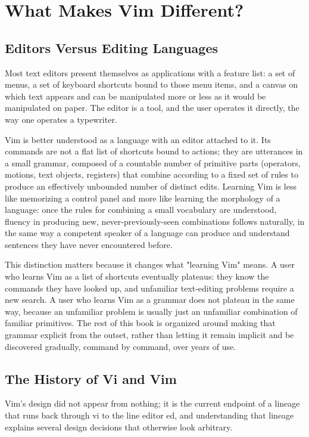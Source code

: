 \chapter{What Makes Vim Different?}
\label{ch:different}

\section{Editors Versus Editing Languages}

Most text editors present themselves as applications with a feature list: a set of menus, a set of keyboard shortcuts bound to those menu items, and a canvas on which text appears and can be manipulated more or less as it would be manipulated on paper. The editor is a tool, and the user operates it directly, the way one operates a typewriter.

Vim is better understood as a language with an editor attached to it. Its commands are not a flat list of shortcuts bound to actions; they are utterances in a small grammar, composed of a countable number of primitive parts (operators, motions, text objects, registers) that combine according to a fixed set of rules to produce an effectively unbounded number of distinct edits. Learning Vim is less like memorizing a control panel and more like learning the morphology of a language: once the rules for combining a small vocabulary are understood, fluency in producing new, never-previously-seen combinations follows naturally, in the same way a competent speaker of a language can produce and understand sentences they have never encountered before.

This distinction matters because it changes what "learning Vim" means. A user who learns Vim as a list of shortcuts eventually plateaus: they know the commands they have looked up, and unfamiliar text-editing problems require a new search. A user who learns Vim as a grammar does not plateau in the same way, because an unfamiliar problem is usually just an unfamiliar combination of familiar primitives. The rest of this book is organized around making that grammar explicit from the outset, rather than letting it remain implicit and be discovered gradually, command by command, over years of use.

\section{The History of Vi and Vim}

Vim's design did not appear from nothing; it is the current endpoint of a lineage that runs back through vi to the line editor ed, and understanding that lineage explains several design decisions that otherwise look arbitrary.

